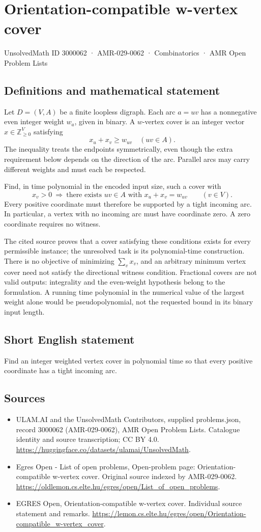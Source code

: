 \documentclass[11pt,a4paper]{article}
\begin{document}
\section*{Orientation-compatible w-vertex cover}\label{3000062}
{\small UnsolvedMath ID 3000062 · AMR-029-0062 · Combinatorics · AMR Open Problem Lists}
\subsection{Definitions and mathematical statement}
Let $D=(V,A)$ be a finite loopless digraph. Each arc $a=uv$ has a
nonnegative even integer weight $w_a$, given in binary. A $w$-vertex
cover is an integer vector $x\in\mathbb Z_{\ge0}^V$ satisfying
\[
                         x_u+x_v\ge w_{uv}\quad(uv\in A).
\]
The inequality treats the endpoints symmetrically, even though the
extra requirement below depends on the direction of the arc. Parallel
arcs may carry different weights and must each be respected.

Find, in time polynomial in the encoded input size, such a cover with
\[
 x_v>0\ \Longrightarrow\
       \text{there exists }uv\in A\text{ with }x_u+x_v=w_{uv}
                     \qquad(v\in V).
\]
Every positive coordinate must therefore be supported by a tight
incoming arc. In particular, a vertex with no incoming arc must have
coordinate zero. A zero coordinate requires no witness.

The cited source proves that a cover satisfying these conditions
exists for every permissible instance; the unresolved task is its
polynomial-time construction. There is no objective of minimizing
$\sum_v x_v$, and an arbitrary minimum vertex cover need not satisfy
the directional witness condition. Fractional covers are not valid
outputs: integrality and the even-weight hypothesis belong to the
formulation. A running time polynomial in the numerical value of the
largest weight alone would be pseudopolynomial, not the requested
bound in its binary input length.
\subsection{Short English statement}
Find an integer weighted vertex cover in polynomial time so that every positive coordinate has a tight incoming arc.
\subsection{Sources}
\begin{itemize}
\item[S1] ULAM.AI and the UnsolvedMath Contributors, supplied problems.json, record 3000062 (AMR-029-0062), AMR Open Problem Lists. Catalogue identity and source transcription; CC BY 4.0.
\url{https://huggingface.co/datasets/ulamai/UnsolvedMath}.
\item[S2] Egres Open - List of open problems, Open-problem page: Orientation-compatible w-vertex cover. Original source indexed by AMR-029-0062.
\url{https://oldlemon.cs.elte.hu/egres/open/List_of_open_problems}.
\item[S3] EGRES Open, Orientation-compatible w-vertex cover. Individual source statement and remarks.
\url{https://lemon.cs.elte.hu/egres/open/Orientation-compatible_w-vertex_cover}.
\end{itemize}
\end{document}
